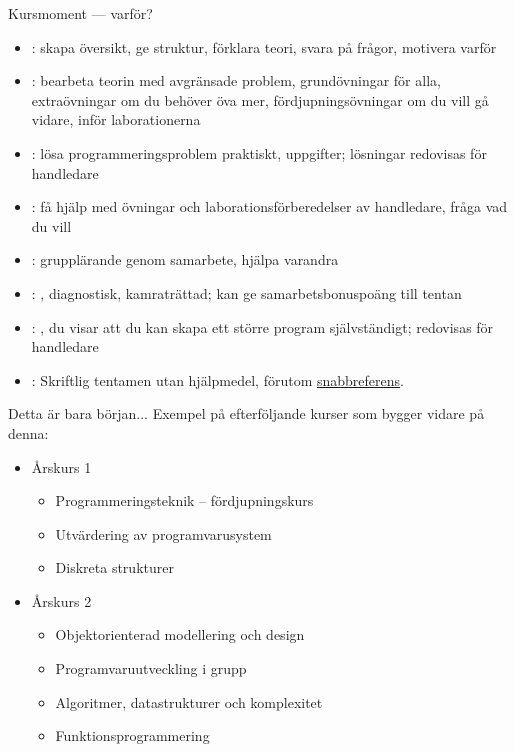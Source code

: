 \begin{Slide}{Kursmoment --- varför?}\SlideOnly{\footnotesize}
\begin{itemize}
\item {}: skapa översikt, ge struktur, förklara teori, svara på frågor, motivera varför
\item {}: bearbeta teorin med avgränsade problem, grundövningar för alla, extraövningar om du behöver öva mer, fördjupningsövningar om du vill gå vidare,  inför laborationerna
\item {}: lösa programmeringsproblem praktiskt,  uppgifter; lösningar redovisas för handledare
\item {}: få hjälp med övningar och laborationsförberedelser av handledare, fråga vad du vill
\item {}: grupplärande genom samarbete, hjälpa varandra 
\item {}: , diagnostisk, kamraträttad; kan ge samarbetsbonuspoäng till tentan
\item {}: , du visar att du kan skapa ett större program självständigt; redovisas för handledare
\item {}: Skriftlig tentamen utan hjälpmedel, förutom  \href{http://fileadmin.cs.lth.se/cs/Education/EDA016/general/quickref-booklet.pdf}{snabbreferens}.
\end{itemize}
\end{Slide}

\ifkompendium\else
\begin{Slide}{Detta är bara början... }
Exempel på efterföljande kurser som bygger vidare på denna:
\begin{itemize}
\item Årskurs 1
\begin{itemize}
\item Programmeringsteknik -- fördjupningskurs
\item Utvärdering av programvarusystem
\item Diskreta strukturer
\end{itemize}
\item Årskurs 2
\begin{itemize}
\item Objektorienterad modellering och design
\item Programvaruutveckling i grupp
\item Algoritmer, datastrukturer och komplexitet
\item Funktionsprogrammering
\end{itemize}
\end{itemize}
\end{Slide}


